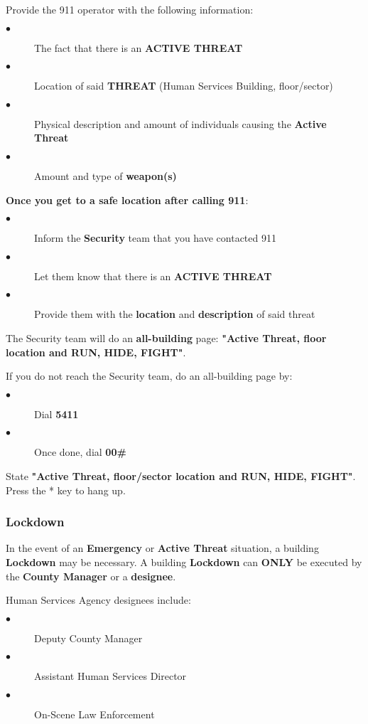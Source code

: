 \documentclass{article}
\begin{document}
Provide the 911 operator with the following information:

\begin{description}
    \item[$\bullet$] The fact that there is an \textbf{ACTIVE THREAT}
    \item[$\bullet$] Location of said \textbf{THREAT} (Human Services Building, floor/sector)
    \item[$\bullet$] Physical description and amount of individuals causing the \textbf{Active Threat}
    \item[$\bullet$] Amount and type of \textbf{weapon(s)}    
\end{description}

\textbf{Once you get to a safe location after calling 911}:
\begin{description}
    \item[$\bullet$] Inform the \textbf{Security} team that you have contacted 911
    \item[$\bullet$] Let them know that there is an \textbf{ACTIVE THREAT}
    \item[$\bullet$] Provide them with the \textbf{location} and \textbf{description} of said threat
\end{description}

The Security team will do an \textbf{all-building} page: \textbf{"Active Threat, floor location and RUN, HIDE, FIGHT"}.

If you do not reach the Security team, do an all-building page by:

\begin{description}
    \item[$\bullet$] Dial \textbf{5411}
    \item[$\bullet$] Once done, dial \textbf{00\#}
\end{description}

State \textbf{"Active Threat, floor/sector location and RUN, HIDE, FIGHT"}. Press the * key to hang up.

\subsubsection{Lockdown}
In the event of an \textbf{Emergency} or \textbf{Active Threat} situation, a building \textbf{Lockdown} may be necessary. A building \textbf{Lockdown} can \textbf{ONLY} be executed by the \textbf{County Manager} or a \textbf{designee}.

Human Services Agency designees include:
\begin{description}
    \item[$\bullet$] Deputy County Manager
    \item[$\bullet$] Assistant Human Services Director
    \item[$\bullet$] On-Scene Law Enforcement
\end{description}
\end{document}
